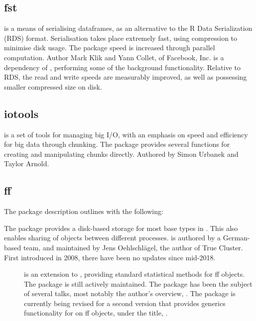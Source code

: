 \subsection{fst}\label{sec:fst}

 is a means of serialising dataframes, as an alternative to the R Data Serialization (RDS) format\cite{klik2022fst}.
Serialisation takes place extremely fast, using compression to minimise disk usage.
The package speed is increased through parallel computation.
Author Mark Klik and Yann Collet, of Facebook, Inc.
 is a dependency of , performing some of the
background functionality.
Relative to RDS, the read and write speeds are measurably improved, as well as possessing smaller compressed size on disk.

\subsection{iotools}\label{subsec:iotools}

 is a set of tools for managing big I/O, with an emphasis on
speed and efficiency for big data through chunking\cite{urbanek20b}.
The package provides several functions for creating and manipulating chunks directly.
Authored by Simon Urbanek and Taylor Arnold.

\subsection{ff}\label{subsec:ff}

The package description outlines  with the following:


The package provides a disk-based storage for most base types in \R{}.
This also enables sharing of objects between different \R{} processes.
 is
authored by a German-based team, and maintained by Jens Oehlschlägel,
the author of True Cluster.
First introduced in 2008\cite{adler08:_large_r}, there have been no updates since mid-2018.

\begin{description}
	\item[\cite{jonge20}]
		is an extension to , providing standard statistical methods for ff
		objects.
		The package is still actively maintained.
		The package has been the subject of several talks, most notably the author's overview, \cite{wijffels13}.
		The package is currently being revised for a second version that provides generics functionality for  on ff objects, under the title, \cite{jonge15}.
\end{description}
